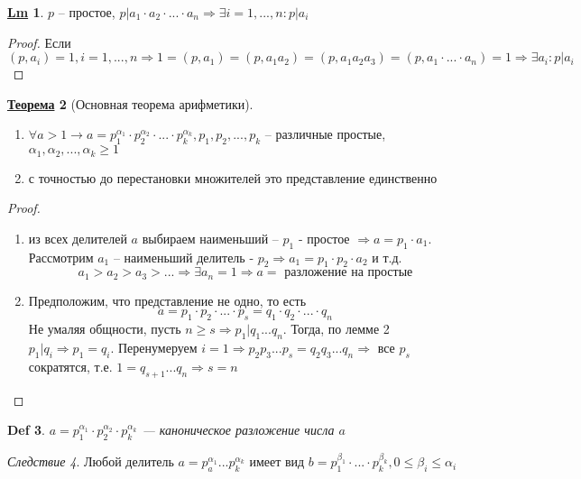 \documentclass[12pt]{article}
\newenvironment{MyList}[1][4pt]{
  \begin{enumerate}[1.]
  \setlength{\parskip}{0pt}
  \setlength{\itemsep}{#1}
}{       
  \end{enumerate}
}
\def\SO{\Rightarrow}     %
\theoremstyle{definition} %
\newtheorem{Thm}{\underline{Теорема}}[subsection] %
\newtheorem{Lm}[Thm]{\underline{Lm}} %
\theoremstyle{plain} %
\newtheorem{Def}[Thm]{Def} %
\theoremstyle{remark} %
\newtheorem{Cons}[Thm]{Следствие} %
\begin{document}
{\begin{Lm}
    $p$ -- простое, $p | a_1 \cdot a_2 \cdot ... \cdot a_n \SO \exists i = 1, ..., n : p | a_i$ 
\end{Lm}

\begin{proof}
    Если $(p, a_i) = 1, i = 1, ..., n \SO 1 = (p, a_1) = (p, a_1 a_2) = (p, a_1 a_2 a_3) = (p, a_1 \cdot ... \cdot a_n) = 1 \SO \exists a_i : p | a_i$ 
\end{proof}

\begin{Thm}[Основная теорема арифметики]
    \begin{MyList}
        \item $\forall a > 1 \to a = p_1^{\alpha_1} \cdot p_2^{\alpha_2} \cdot ... \cdot p_k^{\alpha_k}, p_1, p_2, ..., p_k$ -- различные простые, $\alpha_1, \alpha_2, ..., \alpha_k \geqslant 1$
        \item с точностью до перестановки множителей это представление единственно  
    \end{MyList}
\end{Thm}

\begin{proof}
    \begin{MyList}
        \item из всех делителей $a$ выбираем наименьший -- $p_1$ - простое $\SO a = p_1 \cdot a_1$.
        Рассмотрим $a_1$ -- наименьший делитель - $p_2 \SO a_1 = p_1 \cdot p_2 \cdot a_2$ и т.д. 
        \[a_1 > a_2 > a_3 > ... \SO \exists a_n = 1 \SO a = \text{ разложение на простые}\]
        
        \item Предположим, что представление не одно, то есть 
        \[a = p_1 \cdot p_2 \cdot ... \cdot p_s = q_1 \cdot q_2 \cdot ... \cdot q_n\]
        Не умаляя общности, пусть $n \geqslant s \SO p_1 | q_1 ... q_n$. Тогда, по лемме 2 $p_1 | q_i \SO p_1 = q_i$.
        Перенумеруем $i = 1 \SO p_2 p_3 ... p_s = q_2 q_3 ... q_n \SO$ все $p_s$ сократятся, т.е. $1 = q_{s + 1} ... q_n \SO s = n$     
    \end{MyList}
\end{proof}

\begin{Def}
    $a = p_1^{\alpha_1} \cdot p_2^{\alpha_2} \cdot p_k^{\alpha_k}$ --- каноническое разложение числа $a$ 
\end{Def}

\begin{Cons}
    Любой делитель $a = p_a^{\alpha_1} ... p_k^{\alpha_k}$ имеет вид $b = p_1^{\beta_1} \cdot ... \cdot p_k^{\beta_k}, 0 \leqslant \beta_i \leqslant \alpha_i$  
\end{Cons}

}
\end{document}
